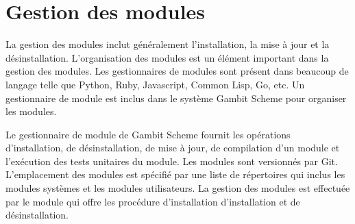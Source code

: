 
\chapter{Gestion des modules}
\label{ch:module_management}
La gestion des modules inclut généralement l'installation, la mise à jour et
la désinstallation. L'organisation des modules est un élément important
dans la gestion des modules. Les gestionnaires de modules sont présent dans
beaucoup de langage telle que Python, Ruby, Javascript, Common Lisp, Go, etc.
Un gestionnaire de module est inclus dans le système Gambit Scheme pour
organiser les modules.

Le gestionnaire de module de Gambit Scheme fournit les opérations
d'installation, de désinstallation, de mise à jour, de compilation
d'un module et l'exécution des tests unitaires du module. Les modules
sont versionnés par Git. L'emplacement des modules est spécifié par
une liste de répertoires qui inclus les modules systèmes et les modules
utilisateurs. La gestion des modules est effectuée par le module 
qui offre les procédure d'installation d'installation et de désinstallation.





